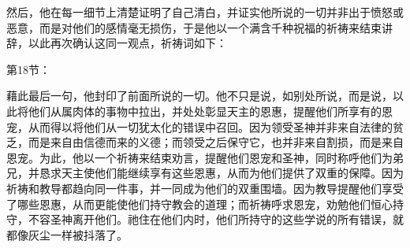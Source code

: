 然后，他在每一细节上清楚证明了自己清白，并证实他所说的一切并非出于愤怒或恶意，而是对他们的感情毫无损伤，于是他以一个满含千种祝福的祈祷来结束讲辞，以此再次确认这同一观点，祈祷词如下：\par

第18节：\par

藉此最后一句，他封印了前面所说的一切。他不只是说，如别处所说，而是说，以此将他们从属肉体的事物中拉出，并处处彰显天主的恩惠，提醒他们所享有的恩宠，从而得以将他们从一切犹太化的错误中召回。因为领受圣神并非来自法律的贫乏，而是来自由信德而来的义德；而领受之后保守它，也并非来自割损，而是来自恩宠。为此，他以一个祈祷来结束劝言，提醒他们恩宠和圣神，同时称呼他们为弟兄，并恳求天主使他们能继续享有这些恩惠，从而为他们提供了双重的保障。因为祈祷和教导都趋向同一件事，并一同成为他们的双重围墙。因为教导提醒他们享受了哪些恩惠，从而更能使他们持守教会的道理；而祈祷呼求恩宠，劝勉他们恒心持守，不容圣神离开他们。祂住在他们内时，他们所持守的这些学说的所有错误，就都像灰尘一样被抖落了。\par

